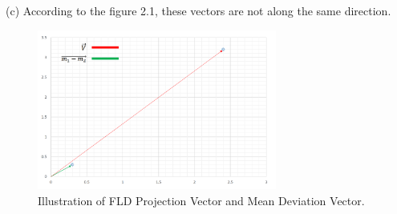\documentclass[12pt]{article}
\numberwithin{equation}{section}
\numberwithin{table}{section}
\numberwithin{figure}{section}
\begin{document}
(c) According to the figure 2.1, these vectors are not along the same direction.
		\begin{figure}[!h]\centering
	\includegraphics[width=0.7\textwidth]{2_c.PNG}
	\caption{Illustration of FLD Projection Vector and Mean Deviation Vector.}
	\label{pl1}
\end{figure}
\end{document}
